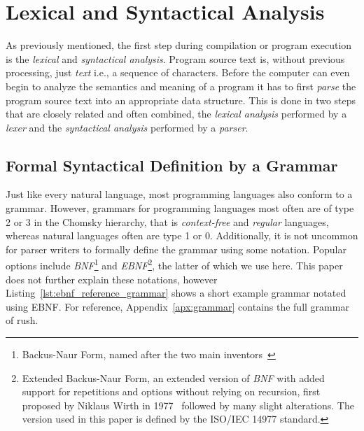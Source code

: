 \section{Lexical and Syntactical Analysis}

As previously mentioned, the first step during compilation or program execution is the \emph{lexical} and \emph{syntactical analysis}.
Program source text is, without previous processing, just \emph{text} i.e., a sequence of characters.
Before the computer can even begin to analyze the semantics and meaning of a program it has to first \emph{parse} the program source text into an appropriate data structure.
This is done in two steps that are closely related and often combined, the \emph{lexical analysis} performed by a \emph{lexer} and the \emph{syntactical analysis} performed by a \emph{parser}.

\subsection{Formal Syntactical Definition by a Grammar}

Just like every natural language, most programming languages also conform to a grammar.
However, grammars for programming languages most often are of type 2 or 3 in the Chomsky hierarchy, that is \emph{context-free} and \emph{regular} languages, whereas natural languages often are type 1 or 0.
Additionally, it is not uncommon for parser writers to formally define the grammar using some notation.
Popular options include \emph{BNF}\footnote{Backus-Naur Form, named after the two main inventors~\cite{Backus1960}} and \emph{EBNF}\footnote{Extended Backus-Naur Form, an extended version of \emph{BNF} with added support for repetitions and options without relying on recursion, first proposed by Niklaus Wirth in 1977~\cite{Wirth1977} followed by many slight alterations. The version used in this paper is defined by the ISO/IEC 14977 standard.}, the latter of which we use here.
This paper does not further explain these notations, however Listing~\ref{lst:ebnf_reference_grammar} shows a short example grammar notated using EBNF.
For reference, Appendix~\ref{apx:grammar} contains the full grammar of rush.


